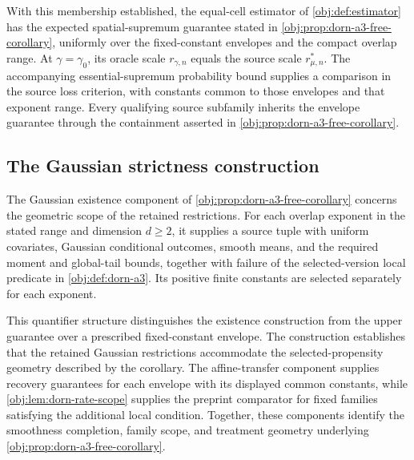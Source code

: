 With this membership established, the equal-cell estimator of \cref{obj:def:estimator} has the expected spatial-supremum guarantee stated in \cref{obj:prop:dorn-a3-free-corollary}, uniformly over the fixed-constant envelopes and the compact overlap range. At \(\gamma=\gamma_0\), its oracle scale \(r_{\gamma,n}\) equals the source scale \(r^*_{\mu,n}\). The accompanying essential-supremum probability bound supplies a comparison in the source loss criterion, with constants common to those envelopes and that exponent range. Every qualifying source subfamily inherits the envelope guarantee through the containment asserted in \cref{obj:prop:dorn-a3-free-corollary}.

\subsection{The Gaussian strictness construction}

The Gaussian existence component of \cref{obj:prop:dorn-a3-free-corollary} concerns the geometric scope of the retained restrictions. For each overlap exponent in the stated range and dimension \(d\ge2\), it supplies a source tuple with uniform covariates, Gaussian conditional outcomes, smooth means, and the required moment and global-tail bounds, together with failure of the selected-version local predicate in \cref{obj:def:dorn-a3}. Its positive finite constants are selected separately for each exponent.

This quantifier structure distinguishes the existence construction from the upper guarantee over a prescribed fixed-constant envelope. The construction establishes that the retained Gaussian restrictions accommodate the selected-propensity geometry described by the corollary. The affine-transfer component supplies recovery guarantees for each envelope with its displayed common constants, while \cref{obj:lem:dorn-rate-scope} supplies the preprint comparator for fixed families satisfying the additional local condition. Together, these components identify the smoothness completion, family scope, and treatment geometry underlying \cref{obj:prop:dorn-a3-free-corollary}.
